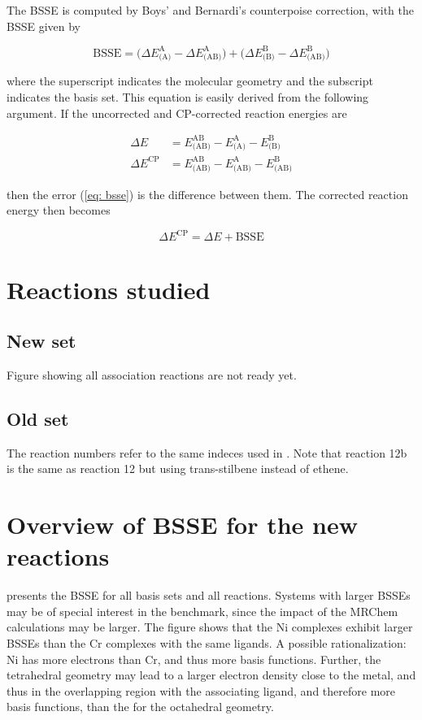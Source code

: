 \documentclass[11pt,a4paper]{article}
\begin{document}
The BSSE is computed by Boys' and Bernardi's counterpoise correction, with the BSSE given by

\begin{equation} \label{eq: bsse}
\text{BSSE} = \Big(\Delta E^{\text{A}}_{\text{(A)}} - \Delta E^{\text{A}}_{\text{(AB)}} \Big) + \Big( \Delta E^{\text{B}}_{\text{(B)}} - \Delta E^{\text{B}}_{\text{(AB)}}\Big )			
\end{equation}

where the superscript indicates the molecular geometry and the subscript indicates the basis set.
This equation is easily derived from the following argument.
If the uncorrected and CP-corrected reaction energies are

\begin{align} \label{eq: rxn uncorrected}
\Delta E &= E^{\text{AB}}_{\text{(AB)}} - E^{\text{A}}_{\text{(A)}} - E^{\text{B}}_{\text{(B)}} \\ \label{eq: rxn corrected}
\Delta E^{\text{CP}} &= E^{\text{AB}}_{\text{(AB)}} - E^{\text{A}}_{\text{(AB)}} - E^{\text{B}}_{\text{(AB)}}
\end{align}

then the error (\cref{eq: bsse}) is the difference between them.
The corrected reaction energy then becomes

\begin{equation} \label{eq: }
\Delta E^{\text{CP}} = \Delta E + \text{BSSE}
\end{equation}

\section{Reactions studied}
	\subsection{New set}
	Figure showing all association reactions are not ready yet.
	
	
	\subsection{Old set}
	The reaction numbers refer to the same indeces used in \textcite{dohm2018}.
	Note that reaction 12b is the same as reaction 12 but using trans-stilbene instead of ethene.

\section{Overview of BSSE for the new reactions}
 presents the BSSE for all basis sets and all reactions. 
Systems with larger BSSEs may be of special interest in the benchmark, since the impact of
the MRChem calculations may be larger.
The figure shows that the Ni complexes exhibit larger BSSEs than the Cr complexes with the same ligands.
A possible rationalization: Ni has more electrons than Cr, and thus more basis functions.
Further, the tetrahedral geometry may lead to a larger electron density close to the metal, and thus in the overlapping region with the associating ligand, and therefore more basis functions, than the for the octahedral geometry.
\end{document}
